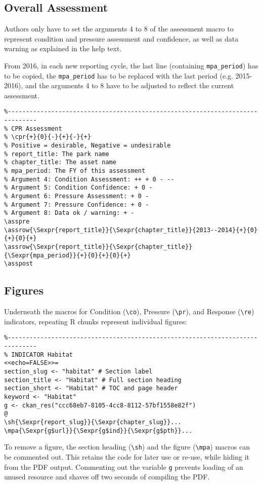 \subsection*{Overall Assessment}
Authors only have to set the arguments 4 to 8 of the assessment macro to represent
condition and pressure assessment and confidence, as well as data warning as
explained in the help text.

From 2016, in each new reporting cycle, the last line (containing \texttt{mpa\_period})
has to be copied, the \texttt{mpa\_period} has to be replaced with the last period
(e.g. 2015-2016), and the arguments 4 to 8 have to be adjusted to reflect the current
assessment.

{\small\begin{verbatim}
%------------------------------------------------------------------------------
% CPR Assessment
% \cpr{+}{0}{-}{+}{-}{+}
% Positive = desirable, Negative = undesirable
% report_title: The park name
% chapter_title: The asset name
% mpa_period: The FY of this assessment
% Argument 4: Condition Assessment: ++ + 0 - --
% Argument 5: Condition Confidence: + 0 -
% Argument 6: Pressure Assessment: + 0 -
% Argument 7: Pressure Confidence: + 0 -
% Argument 8: Data ok / warning: + -
\asspre
\assrow{\Sexpr{report_title}}{\Sexpr{chapter_title}}{2013--2014}{+}{0}{+}{0}{+}
\assrow{\Sexpr{report_title}}{\Sexpr{chapter_title}}{\Sexpr{mpa_period}}{+}{0}{+}{0}{+}
\asspost
\end{verbatim}}

\subsection*{Figures}
Underneath the macros for Condition (\texttt{\textbackslash co}),
Pressure (\texttt{\textbackslash pr}), and Response (\texttt{\textbackslash re})
indicators, repeating R chunks represent individual figures:

{\small\begin{verbatim}
%------------------------------------------------------------------------------
% INDICATOR Habitat
<<echo=FALSE>>=
section_slug <- "habitat" # Section label
section_title <- "Habitat" # Full section heading
section_short <- "Habitat" # TOC and page header
keyword <- "Habitat"
g <- ckan_res("ccc68eb7-8105-4cc8-8112-57bf1558e82f")
@
\sh{\Sexpr{report_slug}}{\Sexpr{chapter_slug}}...
\mpa{\Sexpr{g$url}}{\Sexpr{g$ind}}{\Sexpr{g$pth}}...
\end{verbatim}}

To remove a figure, the section heading (\texttt{\textbackslash sh}) and the
figure (\texttt{\textbackslash mpa}) macros can be commented out.
This retains the code for later use or re-use, while hiding it from the PDF output.
Commenting out the variable \texttt{g} prevents loading of an unused resource and
shaves off two seconds of compiling the PDF.

